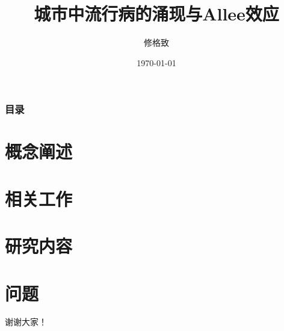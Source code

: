\documentclass{beamer}
\title[Allee Effect]{城市中流行病的涌现与Allee效应}
\author{修格致}
\institute[IRSGIS@PKU]{北京大学遥感与地理信息系统研究所\\
    \medskip
    \textit{xiugz@pku.edu.com}}
\date{\today}
\begin{document}
\begin{frame}
\titlepage
\end{frame}

\begin{frame}
\frametitle{目录}
\tableofcontents
\end{frame}

\section{概念阐述}

\section{相关工作}

\section{研究内容}

\section{问题}


\begin{frame}
\Huge{\centerline{谢谢大家！}}
\end{frame}
\end{document}
